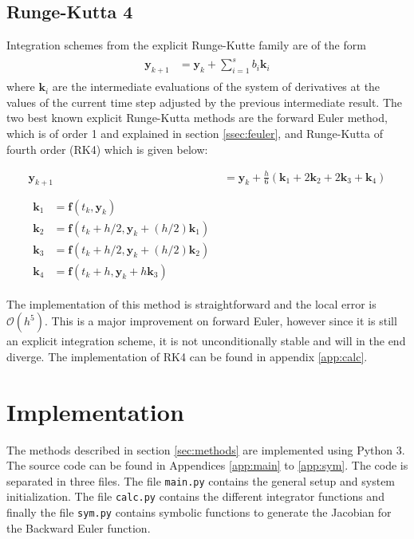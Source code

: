 \documentclass{article}
\begin{document}
\subsection{Runge-Kutta 4}
Integration schemes from the explicit Runge-Kutte family are of the form
\begin{align}
\begin{split}
\mathbf{y}_{k+1} &= \mathbf{y}_k + \sum\limits_{i=1}^s b_i \mathbf{k}_i
\label{eq:rkfam}
\end{split}
\end{align}
where $\mathbf{k}_i$ are the intermediate evaluations of the system of derivatives at the values of the current time step adjusted by the previous intermediate result. The two best known explicit Runge-Kutta methods are the forward Euler method, which is of order 1 and explained in section \ref{ssec:feuler}, and Runge-Kutta of fourth order (RK4) which is given below: 

\begin{align}
\mathbf{y}_{k+1}& = \mathbf{y}_k + \frac{h}{6}(\mathbf{k}_1 + 2\mathbf{k}_2 + 2\mathbf{k}_3 + \mathbf{k}_4)\\
~ \nonumber \\
\begin{split}
\mathbf{k}_1& = \mathbf{f}(t_k, \mathbf{y}_k)\\
\mathbf{k}_2& = \mathbf{f}(t_k + h/2, \mathbf{y}_k + (h/2)\mathbf{k}_1) \\
\mathbf{k}_3& = \mathbf{f}(t_k + h/2, \mathbf{y}_k + (h/2)\mathbf{k}_2) \\
\mathbf{k}_4& = \mathbf{f}(t_k + h, \mathbf{y}_k + h\mathbf{k}_3)
\end{split}
\end{align}

The implementation of this method is straightforward and the local error is $\mathcal{O}(h^5)$. This is a major improvement on forward Euler, however since it is still an explicit integration scheme, it is not unconditionally stable and will in the end diverge.
The implementation of RK4 can be found in appendix \ref{app:calc}. 

\section{Implementation}
The methods described in section \ref{sec:methods} are implemented using Python 3. The source code can be found in Appendices \ref{app:main} to \ref{app:sym}. The code is separated in three files. The file \texttt{main.py} contains the general setup and system initialization. The file \texttt{calc.py} contains the different integrator functions and finally the file \texttt{sym.py} contains symbolic functions to generate the Jacobian for the Backward Euler function.\\
\end{document}
